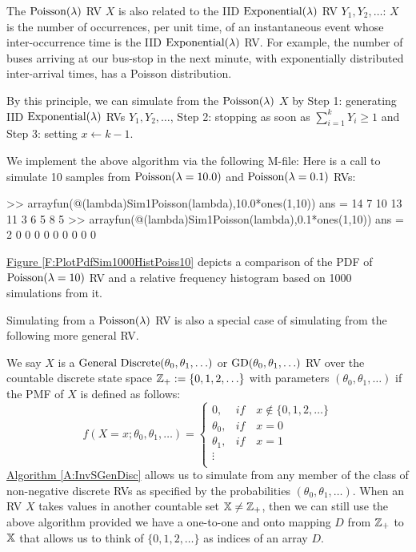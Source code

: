 The $\mbox{{\rm Poisson}}(\lambda)$ RV $X$ is also related to the IID $\mbox{{\rm Exponential}}(\lambda)$ RV $Y_1,Y_2,\ldots$: $X$ is the number of occurrences, per unit time, of an instantaneous event whose inter-occurrence time is the IID $\mbox{{\rm Exponential}}(\lambda)$ RV.  For example, the number of buses arriving at our bus-stop in the next minute, with exponentially distributed inter-arrival times, has a Poisson distribution.
\begin{simulation}\label{SIM:Poisson}
By this principle, we can simulate from the $\mbox{{\rm Poisson}}(\lambda)$ $X$ by {\sf Step 1}: generating IID $\mbox{{\rm Exponential}}(\lambda)$ RVs $Y_1,Y_2,\ldots$, {\sf Step 2}: stopping as soon as $\sum_{i=1}^k Y_i \geq 1$ and {\sf Step 3:} setting $x \gets k-1$.

We implement the above algorithm via the following M-file:
Here is a call to simulate 10 samples from $\mbox{{\rm Poisson}}(\lambda=10.0)$ and $\mbox{{\rm Poisson}}(\lambda=0.1)$ RVs:
\begin{VrbM}
>> arrayfun(@(lambda)Sim1Poisson(lambda),10.0*ones(1,10)) %
ans =    14     7    10    13    11     3     6     5     8     5
>> arrayfun(@(lambda)Sim1Poisson(lambda),0.1*ones(1,10)) %
ans =     2     0     0     0     0     0     0     0     0     0
\end{VrbM}
\hyperref[F:PlotPdfSim1000HistPoiss10]{Figure \ref*{F:PlotPdfSim1000HistPoiss10}} depicts a comparison of the PDF of $\mbox{{\rm Poisson}}(\lambda=10)$ RV and a relative frequency histogram based on 1000 simulations from it.
\end{simulation}

Simulating from a $\mbox{{\rm Poisson}}(\lambda)$ RV is also a special case of simulating from the following more general RV.
\begin{model}
We say $X$ is a $\mbox{{\rm General Discrete}}(\theta_0,\theta_1,\ldots)$ or $\mbox{{\rm GD}}(\theta_0,\theta_1,\ldots)$ RV over the countable discrete state space $\mathbb{Z}_+ := \{0,1,2,\ldots\}$ with parameters $(\theta_0,\theta_1,\ldots)$ if the PMF of $X$ is defined as follows:
\[
f(X=x; \theta_0,\theta_1,\ldots) =
\begin{cases}
0, & if \quad x \notin  \{0,1,2,\ldots\} \\
 \theta_0, & if \quad x=0 \\
 \theta_1, & if \quad x=1 \\
\vdots & \\
\end{cases}
\]
\hyperref[A:InvSGenDisc]{Algorithm \ref*{A:InvSGenDisc}} allows us to simulate from any member of the class of non-negative discrete RVs as specified by the probabilities $(\theta_0,\theta_1,\ldots)$.  When an RV $X$ takes  values in another countable set $\mathbb{X} \neq \mathbb{Z}_+$, then we can still use the above algorithm provided we have a one-to-one and onto mapping $D$ from $\mathbb{Z}_+$ to $\mathbb{X}$ that allows us to think of $\{0,1,2,\ldots\}$ as indices of an array $D$.
\end{model}

